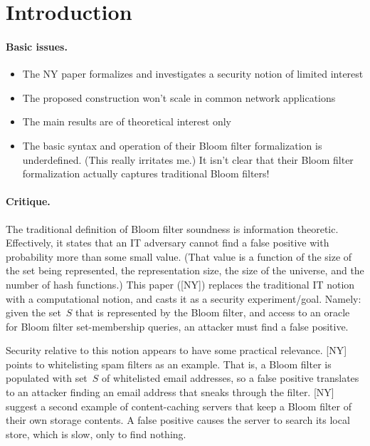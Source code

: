 \section{Introduction}
\paragraph{Basic issues. }
\begin{itemize}
\item The NY paper formalizes and investigates a security notion of limited interest
\item The proposed construction won’t scale in common network applications
\item The main results are of theoretical interest only
\item The basic syntax and operation of their Bloom filter formalization is underdefined.  (This really irritates me.)  It isn’t clear that their Bloom filter formalization actually captures traditional Bloom filters!
\end{itemize}

\paragraph{Critique. }
The traditional definition of Bloom filter soundness is information theoretic.  Effectively, it states that an IT adversary cannot find a false positive with probability more than some small value.  (That value is a function of the size of the set being represented, the representation size, the size of the universe, and the number of hash functions.)  This paper ([NY]) replaces the traditional IT notion with a computational notion, and casts it as a security experiment/goal.  Namely: given the set~$S$ that is represented by the Bloom filter, and access to an oracle for Bloom filter set-membership queries, an attacker must find a false positive.  


Security relative to this notion appears to have some practical relevance.  [NY] points to whitelisting spam filters as an example.  That is, a Bloom filter is populated with set~$S$ of whitelisted email addresses, so a false positive translates to an attacker finding an email address that sneaks through the filter.  [NY] suggest a second example of content-caching servers that keep a Bloom filter of their own storage contents.  A false positive causes the server to search its local store, which is slow, only to find nothing.

